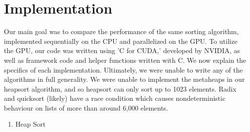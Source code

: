 \documentclass{article}
\begin{document}
\section{Implementation}
Our main goal was to compare the performance of the same sorting algorithm, implemented sequentially on the CPU and parallelized on the GPU. To utilize the GPU, our code was written using 'C for CUDA,' developed by NVIDIA, as well as framework code and helper functions written with C. We now explain the specifics of each implementation.  Ultimately, we were unable to write any of the algorithms in full generality.  We were unable to implement the metaheaps in our heapsort algorithm, and so heapsort can only sort up to 1023 elements.  Radix and quicksort (likely) have a race condition which causes nondeterministic behaviour on lists of more than around 6,000 elements.
\begin{enumerate}
  \setlength{\itemsep}{10pt}
  \setlength{\parskip}{10pt}

  \item Heap Sort


\end{enumerate}
\end{document}
